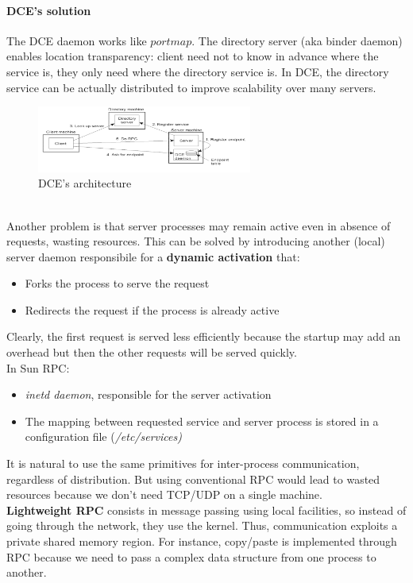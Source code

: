 \documentclass[10pt,a4paper]{article}
\begin{document}
\paragraph{DCE's solution} 
The DCE daemon works like $portmap$. The directory server (aka binder daemon) enables location transparency: client need not to know in advance where the service is, they only need where the directory service is. In DCE, the directory service can be actually distributed to improve scalability over many servers.
\begin{figure}[h!]
 \hfill \includegraphics[width=200pt]{images/dce.png}\hspace*{\fill}
 \caption{DCE's architecture}
  \label{fig:dce}
\end{figure} \\
Another problem is that server processes may remain active even in absence of requests, wasting resources. This can be solved by introducing another (local) server daemon responsibile for a \textbf{dynamic activation} that:
\begin{itemize}
	\item Forks the process to serve the request
	\item Redirects the request if the process is already active
\end{itemize}
Clearly, the first request is served less efficiently because the startup may add an overhead but then the other requests will be served quickly. \\
In Sun RPC:
\begin{itemize}
	\item \textit{inetd daemon}, responsible for the server activation
	\item The mapping between requested service and server process is stored in a configuration file (\textit{/etc/services)}
\end{itemize}
It is natural to use the same primitives for inter-process communication, regardless of distribution. But using conventional RPC would lead to wasted resources because we don't need TCP/UDP on a single machine. \\
\textbf{Lightweight RPC} consists in message passing using local facilities, so instead of going through the network, they use the kernel. Thus, communication exploits a private shared memory region. For instance, copy/paste is implemented through RPC because we need to pass a complex data structure from one process to another. \\
\end{document}
